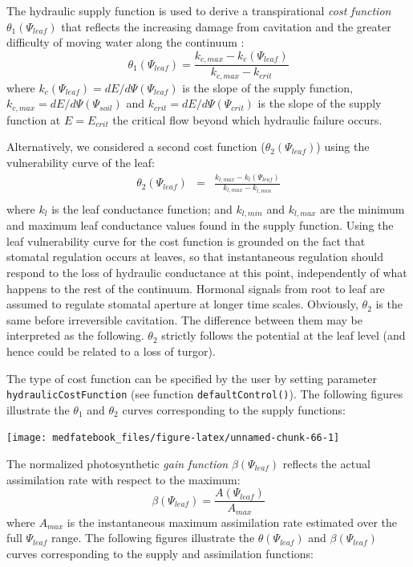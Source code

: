 \documentclass[]{book}
\begin{document}
The hydraulic supply function is used to derive a transpirational \emph{cost function} \(\theta_1(\Psi_{leaf})\) that reflects the increasing damage from cavitation and the greater difficulty of moving water along the continuum \citep{Sperry2016a}:
\begin{equation}
\theta_1(\Psi_{leaf}) = \frac{k_{c,max}-k_{c}(\Psi_{leaf})}{k_{c,max}-k_{crit}}
\end{equation}
where \(k_c(\Psi_{leaf}) = dE/d\Psi(\Psi_{leaf})\) is the slope of the supply function, \(k_{c,max} = dE/d\Psi(\Psi_{soil})\) and \(k_{crit} = dE/d\Psi(\Psi_{crit})\) is the slope of the supply function at \(E = E_{crit}\) the critical flow beyond which hydraulic failure occurs.

Alternatively, we considered a second cost function (\(\theta_2(\Psi_{leaf})\)) using the vulnerability curve of the leaf:
\begin{eqnarray}
\theta_2(\Psi_{leaf}) &=& \frac{k_{l, max}-k_l(\Psi_{leaf})}{k_{l,max} - k_{l,min}}\\
\end{eqnarray}
where \(k_l\) is the leaf conductance function; and \(k_{l,min}\) and \(k_{l,max}\) are the minimum and maximum leaf conductance values found in the supply function. Using the leaf vulnerability curve for the cost function is grounded on the fact that stomatal regulation occurs at leaves, so that instantaneous regulation should respond to the loss of hydraulic conductance at this point, independently of what happens to the rest of the continuum. Hormonal signals from root to leaf are assumed to regulate stomatal aperture at longer time scales. Obviously, \(\theta_2\) is the same before irreversible cavitation. The difference between them may be interpreted as the following. \(\theta_2\) strictly follows the potential at the leaf level (and hence could be related to a loss of turgor).

The type of cost function can be specified by the user by setting parameter \texttt{hydraulicCostFunction} (see function \texttt{defaultControl()}). The following figures illustrate the \(\theta_1\) and \(\theta_2\) curves corresponding to the supply functions:

\begin{center}\texttt{[image: medfatebook\_files/figure-latex/unnamed-chunk-66-1]} \end{center}

The normalized photosynthetic \emph{gain function} \(\beta(\Psi_{leaf})\) reflects the actual assimilation rate with respect to the maximum:
\begin{equation}
\beta(\Psi_{leaf}) = \frac{A(\Psi_{leaf})}{A_{max}}
\end{equation}
where \(A_{max}\) is the instantaneous maximum assimilation rate estimated over the full \(\Psi_{leaf}\) range. The following figures illustrate the \(\theta(\Psi_{leaf})\) and \(\beta(\Psi_{leaf})\) curves corresponding to the supply and assimilation functions:
\end{document}
